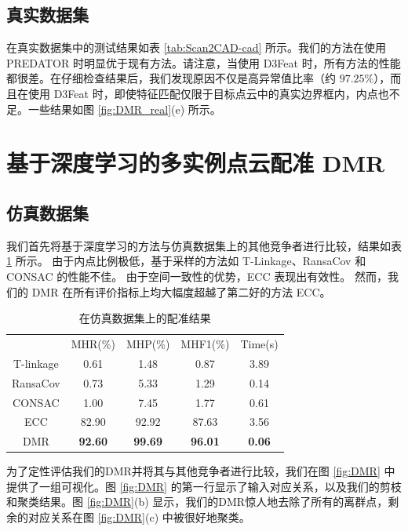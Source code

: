 \subsection{真实数据集}
在真实数据集中的测试结果如表 \ref{tab:Scan2CAD-cad} 所示。我们的方法在使用 PREDATOR 时明显优于现有方法。请注意，当使用 D3Feat 时，所有方法的性能都很差。在仔细检查结果后，我们发现原因不仅是高异常值比率（约 $97.25\%$），而且在使用 D3Feat 时，即使特征匹配仅限于目标点云中的真实边界框内，内点也不足。一些结果如图 \ref{fig:DMR_real}(e) 所示。


\section{基于深度学习的多实例点云配准 DMR}
\subsection{仿真数据集}
我们首先将基于深度学习的方法与仿真数据集上的其他竞争者进行比较，结果如表 \ref{table1} 所示。
由于内点比例极低，基于采样的方法如 T-Linkage、RansaCov 和 CONSAC 的性能不佳。
由于空间一致性的优势，ECC 表现出有效性。
然而，我们的 DMR 在所有评价指标上均大幅度超越了第二好的方法 ECC。

\setlength{\tabcolsep}{8pt}
\begin{table}[ht]
  \centering
  \caption{在仿真数据集上的配准结果}
  \begin{tabular}{ccccc}
    \hline\noalign{\smallskip}
  & MHR(\%)         & MHP(\%)         & MHF1(\%)         & Time(s)       \\
  \noalign{\smallskip}
  \hline
  \noalign{\smallskip}
  T-linkage  & 0.61           & 1.48           & 0.87           & 3.89          \\
  RansaCov   & 0.73           & 5.33           & 1.29           & 0.14          \\
  CONSAC     & 1.00           & 7.45           & 1.77           & 0.61          \\
  ECC         & 82.90          & 92.92          & 87.63          & 3.56          \\
  DMR              & \textbf{92.60} & \textbf{99.69} & \textbf{96.01} & \textbf{0.06} \\
  \hline
  \end{tabular}
  \label{table1}
\end{table}

为了定性评估我们的DMR并将其与其他竞争者进行比较，我们在图 \ref{fig:DMR} 中提供了一组可视化。图 \ref{fig:DMR} 的第一行显示了输入对应关系，以及我们的剪枝和聚类结果。图 \ref{fig:DMR}(b) 显示，我们的DMR惊人地去除了所有的离群点，剩余的对应关系在图 \ref{fig:DMR}(c) 中被很好地聚类。

